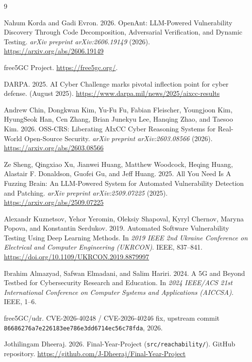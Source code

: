 \documentclass[sigconf]{acmart}
\begin{document}
\begin{thebibliography}{9}

Nahum Korda and Gadi Evron. 2026. OpenAnt: LLM-Powered Vulnerability Discovery
Through Code Decomposition, Adversarial Verification, and Dynamic Testing.
\textit{arXiv preprint arXiv:2606.19149} (2026).
\url{https://arxiv.org/abs/2606.19149}

free5GC Project. \url{https://free5gc.org/}.

DARPA. 2025. AI Cyber Challenge marks pivotal inflection point for cyber defense.
(August 2025). \url{https://www.darpa.mil/news/2025/aixcc-results}

Andrew Chin, Dongkwan Kim, Yu-Fu Fu, Fabian Fleischer, Youngjoon Kim, HyungSeok
Han, Cen Zhang, Brian Junekyu Lee, Hanqing Zhao, and Taesoo Kim. 2026. OSS-CRS:
Liberating AIxCC Cyber Reasoning Systems for Real-World Open-Source Security.
\textit{arXiv preprint arXiv:2603.08566} (2026).
\url{https://arxiv.org/abs/2603.08566}

Ze Sheng, Qingxiao Xu, Jianwei Huang, Matthew Woodcock, Heqing Huang, Alastair F.
Donaldson, Guofei Gu, and Jeff Huang. 2025. All You Need Is A Fuzzing Brain: An
LLM-Powered System for Automated Vulnerability Detection and Patching.
\textit{arXiv preprint arXiv:2509.07225} (2025).
\url{https://arxiv.org/abs/2509.07225}

Alexandr Kuznetsov, Yehor Yeromin, Oleksiy Shapoval, Kyryl Chernov, Maryna
Popova, and Konstantin Serdukov. 2019. Automated Software Vulnerability Testing
Using Deep Learning Methods. In \textit{2019 IEEE 2nd Ukraine Conference on
Electrical and Computer Engineering (UKRCON)}. IEEE, 837--841.
\url{https://doi.org/10.1109/UKRCON.2019.8879997}

Ibrahim Almazyad, Safwan Elmadani, and Salim Hariri. 2024. A 5G and Beyond
Testbed for Cybersecurity Research and Education. In \textit{2024 IEEE/ACS 21st
International Conference on Computer Systems and Applications (AICCSA)}. IEEE,
1--6.

free5GC/udr. CVE-2026-40248 / CVE-2026-40246 fix, upstream commit
\texttt{86686276a7e226183ee786e3dd6714ec56c78fda}, 2026.

Jothilingam Dheeraj. 2026. Final-Year-Project (\texttt{src/reachability/}).
GitHub repository. \url{https://github.com/J-Dheeraj/Final-Year-Project}

\end{thebibliography}
\end{document}
